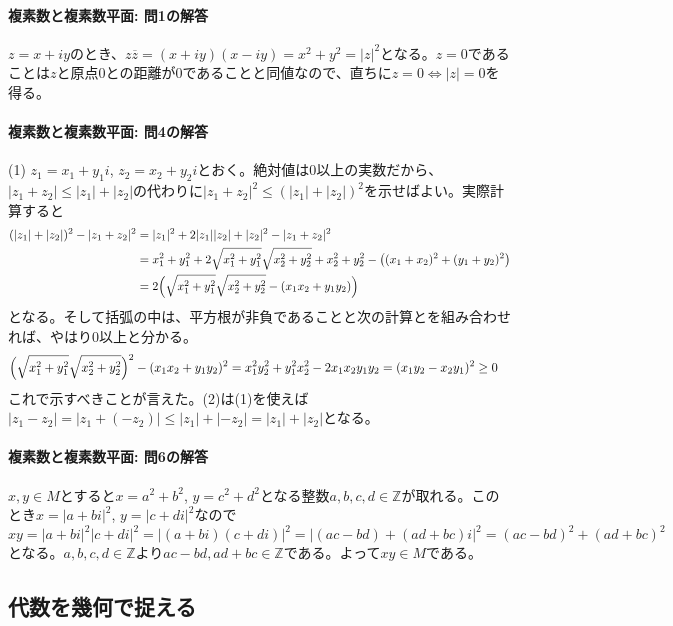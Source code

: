 \paragraph{複素数と複素数平面: 問1の解答}
$z=x+iy$のとき、$z\overline{z}=(x+iy)(x-iy)=x^2+y^2=|z|^2$となる。$z=0$であることは$z$と原点$0$との距離が$0$であることと同値なので、直ちに$z=0\Leftrightarrow|z|=0$を得る。

\paragraph{複素数と複素数平面: 問4の解答}

(1) $z_1 = x_1+y_1 i$, $z_2 = x_2 + y_2 i$とおく。絶対値は$0$以上の実数だから、$|z_1+z_2|\leq |z_1|+|z_2|$の代わりに$|z_1+z_2|^2\leq (|z_1|+|z_2|)^2$を示せばよい。実際計算すると
\begin{align*}
(|z_1|+|z_2|)^2 - |z_1+z_2|^2 
&= |z_1|^2 + 2|z_1||z_2| + |z_2|^2 - |z_1+z_2|^2 \\
&= x_1^2+y_1^2 + 2\sqrt{x_1^2+y_1^2}\sqrt{x_2^2+y_2^2} + x_2^2 + y_2^2 - \bigl((x_1+x_2)^2+(y_1+y_2)^2\bigr) \\
&= 2\Bigl(\sqrt{x_1^2+y_1^2}\sqrt{x_2^2+y_2^2} -(x_1x_2+y_1y_2) \Bigr)
\end{align*}
となる。そして括弧の中は、平方根が非負であることと次の計算とを組み合わせれば、やはり$0$以上と分かる。
\begin{align*}
\Bigl(\sqrt{x_1^2+y_1^2}\sqrt{x_2^2+y_2^2}\Bigr)^2 - (x_1x_2+y_1y_2)^2
&= x_1^2y_2^2+y_1^2x_2^2 - 2x_1x_2y_1y_2 = (x_1y_2-x_2y_1)^2 \geq 0
\end{align*}
これで示すべきことが言えた。(2)は(1)を使えば$|z_1-z_2| = |z_1 + (-z_2) | \leq |z_1|+|{-z_2}| = |z_1| + |z_2|$となる。


\paragraph{複素数と複素数平面: 問6の解答} 

$x,y\in M$とすると$x=a^2+b^2$, $y=c^2+d^2$となる整数$a,b,c,d\in\mathbb{Z}$が取れる。このとき$x=|a+bi|^2$, $y=|c+di|^2$なので$xy=|a+bi|^2|c+di|^2=|(a+bi)(c+di)|^2=|(ac-bd)+(ad+bc)i|^2=(ac-bd)^2+(ad+bc)^2$となる。$a,b,c,d\in\mathbb{Z}$より$ac-bd,ad+bc\in\mathbb{Z}$である。よって$xy\in M$である。

\subsection{代数を幾何で捉える}

